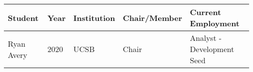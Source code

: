 
\begin{longtable}{lp{1.5cm} p{4.5cm}p{2cm}p{4cm}}
Student & Year & Institution & Chair/Member & Current Employment\\
\hline 
\endhead 
Ryan Avery & 2020 & UCSB & Chair & Analyst  -  Development Seed \\
\end{longtable}

